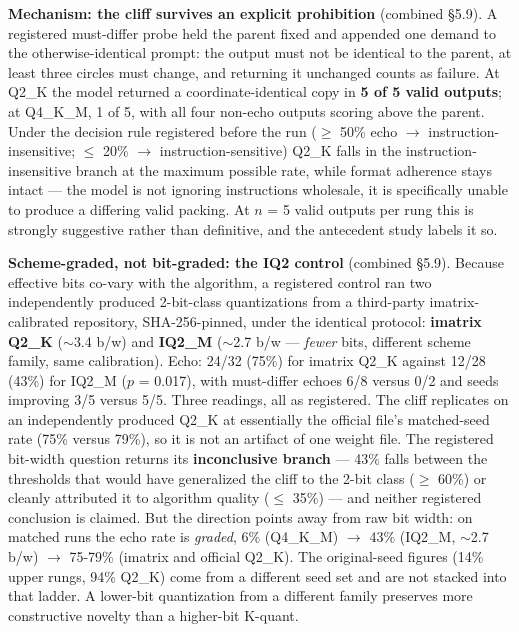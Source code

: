 \documentclass[11pt]{article}
\begin{document}
\textbf{Mechanism: the cliff survives an explicit prohibition} (combined \S5.9). A registered
must-differ probe held the parent fixed and appended one demand to the otherwise-identical
prompt: the output must not be identical to the parent, at least three circles must
change, and returning it unchanged counts as failure. At Q2\_K the model returned a
coordinate-identical copy in \textbf{5 of 5 valid outputs}; at Q4\_K\_M, 1 of 5, with all four
non-echo outputs scoring above the parent. Under the decision rule registered before the
run ($\ge$ 50\% echo $\rightarrow$ instruction-insensitive; $\le$ 20\% $\rightarrow$ instruction-sensitive) Q2\_K falls in
the instruction-insensitive branch at the maximum possible rate, while format adherence
stays intact --- the model is not ignoring instructions wholesale, it is specifically unable
to produce a differing valid packing. At $n$ = 5 valid outputs per rung this is strongly
suggestive rather than definitive, and the antecedent study labels it so.

\textbf{Scheme-graded, not bit-graded: the IQ2 control} (combined \S5.9). Because effective bits
co-vary with the algorithm, a registered control ran two independently produced 2-bit-class
quantizations from a third-party imatrix-calibrated repository, SHA-256-pinned, under the
identical protocol: \textbf{imatrix Q2\_K} ($\sim$3.4 b/w) and \textbf{IQ2\_M} ($\sim$2.7 b/w --- \emph{fewer} bits,
different scheme family, same calibration). Echo: 24/32 (75\%) for imatrix Q2\_K against
12/28 (43\%) for IQ2\_M ($p$ = 0.017), with must-differ echoes 6/8 versus 0/2 and seeds
improving 3/5 versus 5/5. Three readings, all as registered. The cliff replicates on an
independently produced Q2\_K at essentially the official file's matched-seed rate (75\%
versus 79\%), so it is not an artifact of one weight file. The registered bit-width
question returns its \textbf{inconclusive branch} --- 43\% falls between the thresholds that would
have generalized the cliff to the 2-bit class ($\ge$ 60\%) or cleanly attributed it to
algorithm quality ($\le$ 35\%) --- and neither registered conclusion is claimed. But the
direction points away from raw bit width: on matched runs the echo rate is \emph{graded},
6\% (Q4\_K\_M) $\rightarrow$ 43\% (IQ2\_M, $\sim$2.7 b/w) $\rightarrow$ 75-79\% (imatrix and official Q2\_K). The original-seed
figures (14\% upper rungs, 94\% Q2\_K) come from a different seed set and are not stacked
into that ladder. A lower-bit quantization from a different family preserves more
constructive novelty than a higher-bit K-quant.
\end{document}
